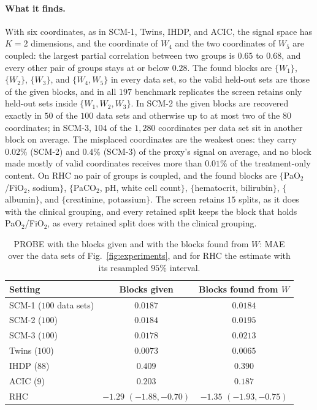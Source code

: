 \paragraph{What it finds.} With six coordinates, as in SCM-1, Twins, IHDP, and ACIC, the signal space has $K=2$ dimensions, and the coordinate of $W_4$ and the two coordinates of $W_5$ are coupled: the largest partial correlation between two groups is $0.65$ to $0.68$, and every other pair of groups stays at or below $0.28$. The found blocks are $\{W_1\}$, $\{W_2\}$, $\{W_3\}$, and $\{W_4,W_5\}$ in every data set, so the valid held-out sets are those of the given blocks, and in all $197$ benchmark replicates the screen retains only held-out sets inside $\{W_1,W_2,W_3\}$. In SCM-2 the given blocks are recovered exactly in $50$ of the $100$ data sets and otherwise up to at most two of the $80$ coordinates; in SCM-3, $104$ of the $1{,}280$ coordinates per data set sit in another block on average. The misplaced coordinates are the weakest ones: they carry $0.02\%$ (SCM-2) and $0.4\%$ (SCM-3) of the proxy's signal on average, and no block made mostly of valid coordinates receives more than $0.01\%$ of the treatment-only content. On RHC no pair of groups is coupled, and the found blocks are $\{$PaO$_2$/FiO$_2$, sodium$\}$, $\{$PaCO$_2$, pH, white cell count$\}$, $\{$hematocrit, bilirubin$\}$, $\{$albumin$\}$, and $\{$creatinine, potassium$\}$. The screen retains $15$ splits, as it does with the clinical grouping, and every retained split keeps the block that holds PaO$_2$/FiO$_2$, as every retained split does with the clinical grouping.

\begin{table}[t]
\centering
\caption{PROBE with the blocks given and with the blocks found from $W$: MAE over the data sets of Fig.~\ref{fig:experiments}, and for RHC the estimate with its resampled $95\%$ interval.}
\label{tab:block-discovery}
\begin{tabular}{lcc}
\toprule
Setting & Blocks given & Blocks found from $W$\\
\midrule
SCM-1 ($100$ data sets) & $0.0187$ & $0.0184$\\
SCM-2 ($100$) & $0.0184$ & $0.0195$\\
SCM-3 ($100$) & $0.0178$ & $0.0213$\\
Twins ($100$) & $0.0073$ & $0.0065$\\
IHDP ($88$) & $0.409$ & $0.390$\\
ACIC ($9$) & $0.203$ & $0.187$\\
RHC & $-1.29$ $(-1.88,-0.70)$ & $-1.35$ $(-1.93,-0.75)$\\
\bottomrule
\end{tabular}
\end{table}

